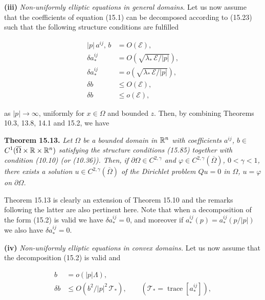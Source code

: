 \medskip

\noindent\textbf{(iii)} \emph{Non-uniformly elliptic equations in general domains.} Let us now assume that
the coefficients of equation (15.1) can be decomposed according to (15.23) such that
the following structure conditions are fulfilled

\begin{equation}\tag{15.85}
\begin{aligned}
|p|\, a^{ij},\, b &= O(\mathcal{E}), \\
\delta a^{ij}_* &= O\!\left(\sqrt{\lambda_*\,\mathcal{E}/|p|}\right), \\
\delta a_*^{ij} &= o\!\left(\sqrt{\lambda_*\,\mathcal{E}/|p|}\right), \\
\delta b &\leq O(\mathcal{E}), \\
\delta b &\leq o(\mathcal{E}),
\end{aligned}
\end{equation}

as $|p| \to \infty$, uniformly for $x \in \Omega$ and bounded $z$. Then, by combining Theorems
10.3, 13.8, 14.1 and 15.2, we have

\medskip

\noindent\textbf{Theorem 15.13.} \emph{Let $\Omega$ be a bounded domain in $\mathbb{R}^n$ with coefficients $a^{ij}$, $b \in$
$C^1(\overline{\Omega} \times \mathbb{R} \times \mathbb{R}^n)$ satisfying the structure conditions (15.85) together with condition
(10.10) (or (10.36)). Then, if $\partial\Omega \in C^{2,\gamma}$ and $\varphi \in C^{2,\gamma}(\overline{\Omega})$, $0 < \gamma < 1$, there exists a
solution $u \in C^{2,\gamma}(\overline{\Omega})$ of the Dirichlet problem $Qu = 0$ in $\Omega$, $u = \varphi$ on $\partial\Omega$.}

\medskip

Theorem 15.13 is clearly an extension of Theorem 15.10 and the remarks
following the latter are also pertinent here. Note that when a decomposition of the
form (15.2) is valid we have $\delta a_*^{ij} = 0$, and moreover if $a_*^{ij}(p) = a_*^{ij}(p/|p|)$ we also have
$\delta a_*^{ij} = 0$.

\medskip

\noindent\textbf{(iv)} \emph{Non-uniformly elliptic equations in convex domains.} Let us now assume
that the decomposition (15.2) is valid and

\begin{equation}\tag{15.86}
\begin{aligned}
b &= o(|p|\Lambda), \\
\delta b &\leq O\!\left(b^2/|p|^2\,\mathcal{T}_*\right), \qquad (\mathcal{T}_* = \operatorname{trace}[a_*^{ij}]),
\end{aligned}
\end{equation}

